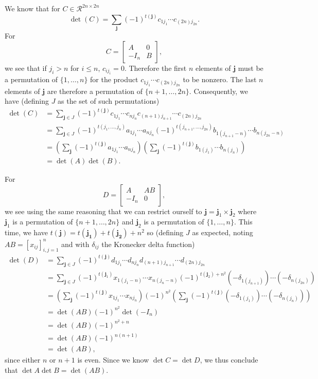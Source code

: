 \begin{solution}
  We know that for $C \in \mathcal{R}^{2n \times 2n}$
  \[ \det(C) = \sum_{\mathbf{j}} (-1)^{t(\mathbf{j})} c_{1j_1} \cdots c_{(2n)j_{2n}}. \]
  For
  \[
    C = \begin{bmatrix}
      A & 0\\
      -I_n & B
    \end{bmatrix},
  \]
  we see that if $j_i > n$ for $i \leq n$, $c_{ij_i} = 0$.
  Therefore the first $n$ elements of $\mathbf{j}$ must be a permutation of $\{1, \ldots, n\}$
  for the product $c_{1j_1} \cdots c_{(2n)j_{2n}}$ to be nonzero.
  The last $n$ elements of $\mathbf{j}$ are therefore a permutation of $\{n+1, \ldots, 2n\}$.
  Consequently, we have (defining $J$ as the set of such permutations)
  \begin{align*}
    \det(C)
    & = \sum_{\mathbf{j} \in J} (-1)^{t(\mathbf{j})} c_{1j_1} \cdots c_{nj_n} c_{(n+1)j_{n+1}} \cdots c_{(2n)j_{2n}}\\
    & = \sum_{\mathbf{j} \in J} (-1)^{t(j_1, \ldots, j_n)} a_{1j_1} \cdots a_{nj_n} (-1)^{t(j_{n+1}, \ldots, j_{2n})} b_{1(j_{n+1}-n)} \cdots b_{n(j_{2n}-n)}\\
    & = \left(\sum_{\mathbf{j}} (-1)^{t(\mathbf{j})} a_{1j_1} \cdots a_{nj_n}\right)
    \left(\sum_{\mathbf{j}} (-1)^{t(\mathbf{j})} b_{1(j_1)} \cdots b_{n(j_n)}\right)\\
    & = \det(A) \det(B).
  \end{align*}

  For
  \[
    D = \begin{bmatrix}
      A & AB\\
      -I_n & 0
    \end{bmatrix},
  \]
  we see using the same reasoning that we can restrict ourself to
  $\mathbf{j} = \mathbf{j}_1 \times \mathbf{j}_2$
  where $\mathbf{j}_1$ is a permutation of $\{n+1, \ldots, 2n\}$
  and $\mathbf{j}_2$ is a permutation of $\{1, \ldots, n\}$.
  This time, we have $t(\mathbf{j}) = t(\mathbf{j_1}) + t(\mathbf{j_2}) + n^2$ so
  (defining $J$ as expected, noting $AB = [x_{ij}]_{i,j=1}^{n}$ and with \(\delta_{ij}\) the Kronecker delta function)
  \begin{align*}
    \det(D)
    & = \sum_{\mathbf{j} \in J} (-1)^{t(\mathbf{j})} d_{1j_1} \cdots d_{nj_n} d_{(n+1)j_{n+1}} \cdots d_{(2n)j_{2n}}\\
    & = \sum_{\mathbf{j} \in J} (-1)^{t(\mathbf{j}_1)} x_{1(j_1-n)} \cdots x_{n(j_n-n)} (-1)^{t(\mathbf{j}_2)+n^2} (-\delta_{1(j_{n+1})}) \cdots (-\delta_{n(j_{2n})})\\
    & = \left(\sum_{\mathbf{j}} (-1)^{t(\mathbf{j})} x_{1j_1} \cdots x_{nj_n}\right)
    (-1)^{n^2}\left(\sum_{\mathbf{j}} (-1)^{t(\mathbf{j})} (-\delta_{1(j_1)}) \cdots (-\delta_{n(j_n)})\right)\\
    & = \det(AB) (-1)^{n^2}\det(-I_n)\\
    & = \det(AB) (-1)^{n^2+n}\\
    & = \det(AB) (-1)^{n(n+1)}\\
    & = \det(AB),
  \end{align*}
  since either $n$ or $n+1$ is even.
  Since we know \(\det C = \det D\), we thus conclude that \(\det A \det B = \det(AB)\).
\end{solution}
